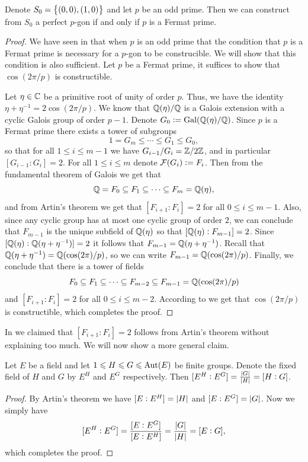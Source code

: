 \documentclass[11pt,a4paper]{article}
\begin{document}
\begin{corollary}
  \label{cor:constructibles}
  Denote $S_0 = \left\{(0,0),(1,0)\right\}$ and let $p$ be an odd prime.
  Then we can construct from $S_0$ a perfect $p$-gon if and only
  if $p$ is a Fermat prime.
\end{corollary}
\begin{proof}
  We have seen in 
  that when $p$ is an odd prime
  that the condition that $p$ is a Fermat prime is necessary
  for a $p$-gon to be construcible.
  We will show that this condition is also sufficient.
  Let $p$ be a Fermat prime,
  it suffices to show that $\cos(2\pi/p)$ is constructible.

  Let $\eta \in \mathbb{C}$ be a primitive root of unity of order $p$.
  Thus, we have the identity $\eta + \eta^{-1} = 2\cos(2\pi/p)$.
  We know that $\mathbb{Q}(\eta)/\mathbb{Q}$ is a Galois extension with
  a cyclic Galois group of order $p - 1$.
  Denote $G_0 := \operatorname{Gal}(\mathbb{Q}(\eta) / \mathbb{Q})$.
  Since $p$ is a Fermat prime there exists a tower of subgroups
  \[
    1 = G_m \leqslant \cdots \leqslant G_1 \leqslant G_0,
  \]
  so that for all $1 \le i \le m - 1$ we have $G_{i-1}/G_{i} = \mathbb{Z}/2\mathbb{Z}$,
  and in particular $[G_{i-1} : G_i] = 2$.
  For all $1 \le i \le m$ denote $\mathcal F(G_i) := F_i$.
  Then from the fundamental theorem of Galois we get that
  \[
    \mathbb{Q} = F_0 \subseteq F_1 \subseteq \cdots \subseteq F_m = \mathbb{Q}(\eta),
  \]
  and from Artin's theorem we get that
  $[F_{i+1} : F_{i}] = 2$ for all $0 \le i \le m - 1$.
  Also, since any cyclic group has at most one cyclic group
  of order $2$, we can conclude that $F_{m-1}$
  is the unique subfield of $\mathbb{Q}(\eta)$ so that $[\mathbb{Q}(\eta) : F_{m-1}] = 2$.
  Since $[\mathbb{Q}(\eta) : \mathbb{Q}(\eta + \eta^{-1})] = 2$
  it follows that $F_{m-1} = \mathbb{Q}(\eta + \eta^{-1})$.
  Recall that $\mathbb{Q}(\eta + \eta^{-1}) = \mathbb{Q}(\cos(2\pi)/p)$,
  so we can write $F_{m-1} = \mathbb{Q}(\cos(2\pi)/p)$.
  Finally, we conclude that there is a tower of fields
  \[
    F_0 \subseteq F_1 \subseteq \cdots
    \subseteq F_{m-2} \subseteq F_{m-1} = \mathbb{Q}(\cos(2\pi)/p)
  \]
  and $[F_{i+1} : F_{i}] = 2$ for all $0 \le i \le m - 2$.
  According to 
  we get that $\cos(2\pi/p)$ is constructible,
  which completes the proof.
\end{proof}
\begin{remark}
  In 
  we claimed that $[F_{i+1} : F_{i}] = 2$ follows from Artin's theorem
  without explaining too much.
  We will now show a more general claim.
\end{remark}
\begin{proposition}
  Let $E$ be a field and let $1 \leqslant H \leqslant G \leqslant \operatorname{Aut}(E)$
  be finite groups.
  Denote the fixed field of $H$ and $G$ by
  $E^H$ and $E^G$ respectively.
  Then $[E^H : E^G] = \frac{\left\lvert G\right\rvert}{\left\lvert H\right\rvert} = [H : G]$.
\end{proposition}
\begin{proof}
  By Artin's theorem we have
  $[E : E^H] = \left\lvert H\right\rvert$ and $[E : E^G] = \left\lvert G\right\rvert$.
  Now we simply have
  \[
    [E^H : E^G] =
    \frac{[E : E^G]}{[E : E^H]} =
    \frac{\left\lvert G\right\rvert}{\left\lvert H\right\rvert} = [E : G],
  \]
  which completes the proof.
\end{proof}
\end{document}
